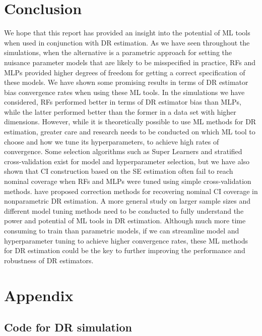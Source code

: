 \documentclass[12pt,twoside]{article}
\begin{document}
\section{Conclusion}

We hope that this report has provided an insight into the potential of ML tools when used in conjunction with DR estimation. As we have seen throughout the simulations, when the alternative is a parametric approach for setting the nuisance parameter models that are likely to be misspecified in practice, RFs and MLPs provided higher degrees of freedom for getting a correct specification of these models. We have shown some promising results in terms of DR estimator bias convergence rates when using these ML tools. In the simulations we have considered, RFs performed better in terms of DR estimator bias than MLPs, while the latter performed better than the former in a data set with higher dimensions. However, while it is theoretically possible to use ML methods for DR estimation, greater care and research needs to be conducted on which ML tool to choose and how we tune its hyperparameters, to achieve high rates of convergence. Some selection algorithms such as Super Learners and stratified cross-validation exist for model and hyperparameter selection, but we have also shown that CI construction based on the \cite{lunceford_davidian} SE estimation often fail to reach nominal coverage when RFs and MLPs were tuned using simple cross-validation methods. \cite{benkeser2017} have proposed correction methods for recovering nominal CI coverage in nonparametric DR estimation. A more general study on larger sample sizes and different model tuning methods need to be conducted to fully understand the power and potential of ML tools in DR estimation. Although much more time consuming to train than parametric models, if we can streamline model and hyperparameter tuning to achieve higher convergence rates, these ML methods for DR estimation could be the key to further improving the performance and robustness of DR estimators.


\clearpage



\clearpage
\section*{Appendix}

\subsection*{Code for DR simulation}


\end{document}
